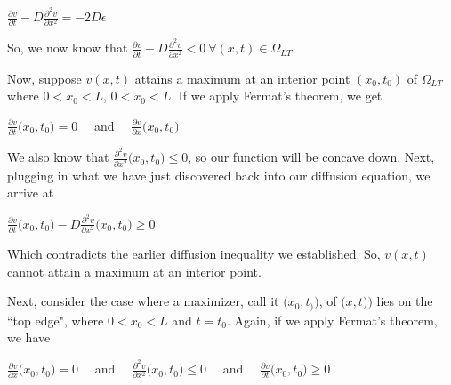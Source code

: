 \documentclass[executivepaper]{article}
\begin{document}
\begin{flushleft}
\begin{center}
\vspace{3mm}

$\frac{\partial v}{\partial t}-D\frac{\partial^2 v}{\partial x^2}=-2D\epsilon$

\end{center}

So, we now know that $\frac{\partial v}{\partial t}-D\frac{\partial^2 v}{\partial x^2} < 0 {~} \forall (x,t) \in \Omega_{LT}$.

\vspace{3mm}

Now, suppose $v(x,t)$ attains a maximum at an interior point $(x_{0},t_{0})$ of $\Omega_{LT}$ where $0 < x_{0} < L$, $0 < x_{0} < L$. If we apply Fermat's theorem, we get

\begin{center}

$\frac{\partial v}{\partial t}\Big(x_{0}, t_{0}\Big)=0 \quad$ and $\quad \frac{\partial v}{\partial x}\Big(x_{0}, t_{0}\Big)$

\end{center}

We also know that $\frac{\partial^2 v}{\partial x^2}\Big(x_{0}, t_{0}\Big) \leq 0$, so our function will be concave down. Next, plugging in what we have just discovered back into our diffusion equation, we arrive at

\begin{center}

$\frac{\partial v}{\partial t}\Big(x_{0}, t_{0}\Big)-D\frac{\partial^2 v}{\partial x^2}\Big(x_{0}, t_{0}\Big) \geq 0$

\end{center}

Which contradicts the earlier diffusion inequality we established. So, $v(x,t)$ cannot attain a maximum at an interior point. 

\vspace{5mm}

Next, consider the case where a maximizer, call it $\Big(x_{0}, t_{)}\Big)$, of $\Big(x,t)\Big)$ lies on the ``top edge", where $0 < x_{0} < L$ and $t=t_{0}$. Again, if we apply Fermat's theorem, we have

\begin{center}

$\frac{\partial v}{\partial x}\Big(x_{0}, t_{0}\Big)=0 \quad$ and $\quad \frac{\partial^2 v}{\partial x^2}\Big(x_{0}, t_{0}\Big) \leq 0 \quad$ and $\quad \frac{\partial v}{\partial t}\Big(x_{0}, t_{0}\Big) \geq 0$


\end{center}
\end{flushleft}
\end{document}
